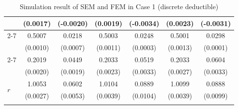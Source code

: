 \documentclass[11pt]{article}
\begin{document}
\begin{table}[!ht]
{{\begin{minipage}{0.65\textwidth}
\begin{tabular}{lcccccc}
         & (0.0017) & (-0.0020) & (0.0019) & (-0.0034) & (0.0023) & (-0.0031) \\
        \cmidrule{2-7}
         & 0.5007 & 0.0218 & 0.5003 & 0.0248 & 0.5001 & 0.0298 \\
         & (0.0010) & (0.0007) & (0.0011) & (0.0003) & (0.0013) & (0.0001) \\
        \cmidrule{2-7}
         & 0.2019 & 0.0449 & 0.2033 & 0.0519 & 0.2033 & 0.0604 \\
         & (0.0020) & (0.0019) & (0.0023) & (0.0033) & (0.0027) & (0.0033) \\
        \midrule
        \multirow{2}{*}{$r$} & 1.0053 & 0.0602 & 1.0104 & 0.0889 & 1.0099 & 0.0888 \\
         & (0.0027) & (0.0053) & (0.0039) & (0.0104) & (0.0039) & (0.0099) \\
        \hhline{=======}
        \end{tabular}
    \end{minipage}
}
}
\caption{Simulation result of SEM and FEM in Case 1 (discrete deductible)}\label{tab:AppSimExoCase1}
\end{table}
\end{document}
